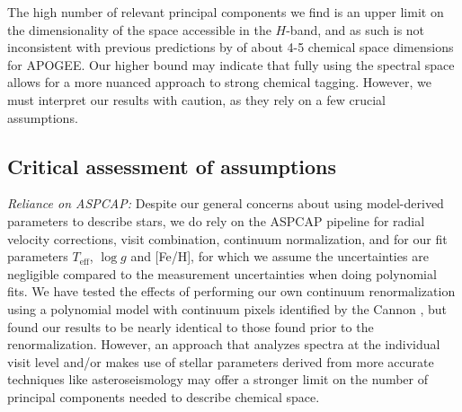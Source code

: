 \documentclass[a4paper,fleqn,usenatbib]{mnras}
\newcommand       \teff     {{T_{\mathrm{eff}}}}
\begin{document}

The high number of relevant principal components we find is an upper limit on the dimensionality of the space accessible in the $H$-band, and as such is not inconsistent with previous predictions by \citet{Ting2015a} of about 4-5 chemical space dimensions for APOGEE. Our higher bound may indicate that fully using the spectral space allows for a more nuanced approach to strong chemical tagging. However, we must interpret our results with caution, as they rely on a few crucial assumptions. 

\subsection{Critical assessment of assumptions}

\textit{Reliance on ASPCAP:} Despite our general concerns about using model-derived parameters to describe stars, we do rely on the ASPCAP pipeline for radial velocity corrections, visit combination, continuum normalization, and for our fit parameters $\teff$, $\log g$ and [Fe/H], for which we assume the uncertainties are negligible compared to the measurement uncertainties when doing polynomial fits. We have tested the effects of performing our own continuum renormalization using a polynomial model with continuum pixels identified by the Cannon \citep{Ness2015}, but found our results to be nearly identical to those found prior to the renormalization. However, an approach that analyzes spectra at the individual visit level and/or makes use of stellar parameters derived from more accurate techniques like asteroseismology may offer a stronger limit on the number of principal components needed to describe chemical space.
\end{document}
